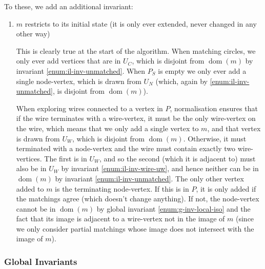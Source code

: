 \documentclass{article}
\DeclareMathOperator{\dom}{dom}
\begin{document}
To these, we add an additional invariant:
\begin{enumerate}[resume,label=(\roman*),ref=(\roman*)]
  \item \label{enum:il-inv-extend} $m$ restricts to its initial state (it is only ever extended, never changed in any other way)

  This is clearly true at the start of the algorithm.  When matching circles, we only ever add vertices that are in $U_C$, which is disjoint from $\dom(m)$ by invariant \ref{enum:il-inv-unmatched}.  When $P_S$ is empty we only ever add a single node-vertex, which is drawn from $U_N$ (which, again by \ref{enum:il-inv-unmatched}, is disjoint from $\dom(m)$).

  When exploring wires connected to a vertex in $P$, normalisation ensures that if the wire terminates with a wire-vertex, it must be the only wire-vertex on the wire, which means that we only add a single vertex to $m$, and that vertex is drawn from $U_W$, which is disjoint from $\dom(m)$.  Otherwise, it must terminated with a node-vertex and the wire must contain exactly two wire-vertices.  The first is in $U_W$, and so the second (which it is adjacent to) must also be in $U_W$ by invariant \ref{enum:il-inv-wire-uw}, and hence neither can be in $\dom(m)$ by invariant \ref{enum:il-inv-unmatched}.  The only other vertex added to $m$ is the terminating node-vertex.  If this is in $P$, it is only added if the matchings agree (which doesn't change anything).  If not, the node-vertex cannot be in $\dom(m)$ by global invariant \ref{enum:g-inv-local-iso} and the fact that its image is adjacent to a wire-vertex not in the image of $m$ (since we only consider partial matchings whose image does not intersect with the image of $m$).
\end{enumerate}


\subsubsection{Global Invariants}
\label{sec:il-global-inv}
\end{document}
